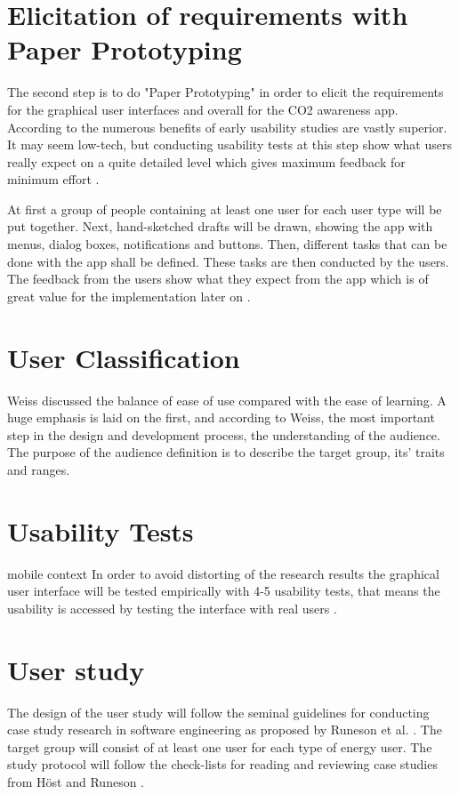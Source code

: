 \section{Elicitation of requirements with Paper Prototyping}
The second step is to do "Paper Prototyping" in order to elicit the requirements for the graphical user interfaces and overall for the CO2 awareness app. According to \cite{lancaster2004paper} the numerous benefits of early usability studies are vastly superior. It may seem low-tech, but conducting usability tests at this step show what users really expect on a quite detailed level which gives maximum feedback for minimum effort \cite{weiss2003handheld}.

At first a group of people containing at least one user for each user type will be put together.  Next, hand-sketched drafts will be drawn, showing the app with menus, dialog boxes, notifications and buttons. Then, different tasks that can be done with the app shall be defined. These tasks are then conducted by the users. The feedback from the users show what they expect from the app which is of great value for the implementation later on \cite{snyder2003paper}.




\section{User Classification}


Weiss \cite{weiss2003handheld} discussed the balance of ease of use compared with the ease of learning. A huge emphasis is laid on the first, and according to Weiss, the most important step in the design and development process, the understanding of the audience. The purpose of the audience definition is to describe the target group, its' traits and ranges.





\section{Usability Tests} mobile context
In order to avoid distorting of the research results the graphical user interface will be tested empirically with 4-5 usability tests, that means the usability is accessed by testing the interface with real users \cite{nielsen1994usability}.

\section{User study}
The design of the user study will follow the seminal guidelines for conducting case study research in software engineering as proposed by Runeson et al. \cite{runeson2012case}. The target group will consist of at least one user for each type of energy user. The study protocol will follow the check-lists for reading and reviewing case studies from H\"ost and Runeson \cite{host2007checklists}.

